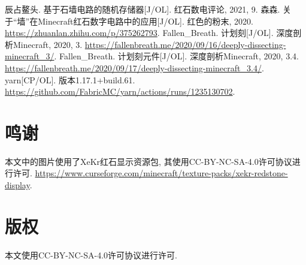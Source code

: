 \documentclass{article}
\begin{document}
    \begin{thebibliography}{99}
        辰占鳌头. 基于石墙电路的随机存储器[J/OL]. 红石数电评论, 2021, 9.
        森森. 关于“墙”在Minecraft红石数字电路中的应用[J/OL]. 红色的粉末, 2020. \url{https://zhuanlan.zhihu.com/p/375262793}.
        Fallen\_Breath. 计划刻[J/OL]. 深度剖析Minecraft, 2020, 3. \url{https://fallenbreath.me/2020/09/16/deeply-dissecting-minecraft_3/}.
        Fallen\_Breath. 计划刻元件[J/OL]. 深度剖析Minecraft, 2020, 3.4. \url{https://fallenbreath.me/2020/09/17/deeply-dissecting-minecraft_3.4/}.
        yarn[CP/OL]. 版本1.17.1+build.61. \url{https://github.com/FabricMC/yarn/actions/runs/1235130702}.
    \end{thebibliography}

    \section*{鸣谢}
    本文中的图片使用了XeKr红石显示资源包, 其使用CC-BY-NC-SA-4.0许可协议进行许可. \url{https://www.curseforge.com/minecraft/texture-packs/xekr-redstone-display}.

    \section*{版权}
    本文使用CC-BY-NC-SA-4.0许可协议进行许可.
\end{document}
